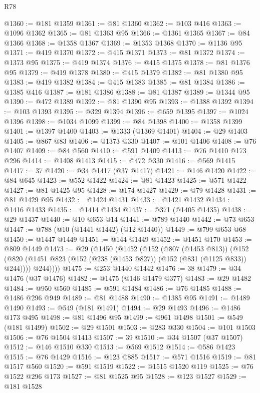\begin{lexlean}{R78}
\begin{coremodule}
@1360 := @181 @1359
@1361 := @81 @1360
@1362 := @103 @416
@1363 := @1096 @1362
@1365 := @81 @1363 @95
@1366 := @1361 @1365
@1367 := @84 @1366
@1368 := @1358 @1367
@1369 := @1353 @1368
@1370 := @1136 @95
@1371 := @419 @1370
@1372 := @415 @1371
@1373 := @81 @1372
@1374 := @1373 @95
@1375 := @419 @1374
@1376 := @415 @1375
@1378 := @81 @1376 @95
@1379 := @419 @1378
@1380 := @415 @1379
@1382 := @81 @1380 @95
@1383 := @419 @1382
@1384 := @415 @1383
@1385 := @81 @1384
@1386 := @1385 @416
@1387 := @181 @1386
@1388 := @81 @1387
@1389 := @1344 @95
@1390 := @472 @1389
@1392 := @81 @1390 @95
@1393 := @1388 @1392
@1394 := @103 @1393
@1395 := @329 @1394
@1396 := @659 @1395
@1397 := @1024 @1396
@1398 := @1034 @1099
@1399 := @84 @1398
@1400 := @1358 @1399
@1401 := @1397 @1400
@1403 := @1333 (@1369 @1401)
@1404 := @29 @1403
@1405 := @867 @83
@1406 := @1373 @330
@1407 := @101 @1406
@1408 := @76 @1407
@1409 := @84 @560
@1410 := @591 @1409
@1413 := @76 @1410 @173 @296
@1414 := @1408 @1413
@1415 := @472 @330
@1416 := @569 @1415
@1417 := 37
@1420 := @34 @1417 (@37 @1417)
@1421 := @146 @1420
@1422 := @84 @645
@1423 := @552 @1422
@1424 := @81 @1423
@1425 := @571 @1422
@1427 := @81 @1425 @95
@1428 := @174 @1427
@1429 := @79 @1428
@1431 := @81 @1429 @95
@1432 := @1424 @1431
@1433 := @1421 @1432
@1434 := @1416 @1433
@1435 := @1414 @1434
@1437 := @371 (@1405 @1435)
@1438 := @29 @1437
@1440 := @10 @653 @14
@1441 := @789 @1440
@1442 := @73 @653
@1447 := @788 (@10 (@1441 @1442) (@12 @1440))
@1449 := @799 @653 @68
@1450 := @1447 @1449
@1451 := @144 @1449
@1452 := @1451 @170
@1453 := @809 @1449
@1473 := @29
    (@1450
      (@1452
        (@152
          (@807 (@1453 @813))
          (@152
            (@820 (@1451 @823 (@152 (@238 (@1453 @827)) (@152 (@831 (@1125 @833)) @244))))
            @244))))
@1475 := @253 @1440 @1442
@1476 := 38
@1479 := @34 @1476 (@37 @1476)
@1482 := @1475 (@146 @1479 @377)
@1483 := @29 @1482
@1484 := @950 @560
@1485 := @591 @1484
@1486 := @76 @1485
@1488 := @1486 @296 @949
@1489 := @81 @1488
@1490 := @1385 @95
@1491 := @1489 @1490
@1493 := @549 (@181 @1491)
@1494 := @29 @1493
@1496 := @1486 @173 @495
@1498 := @81 @1496 @95
@1499 := @961 @1498
@1501 := @549 (@181 @1499)
@1502 := @29 @1501
@1503 := @283 @330
@1504 := @101 @1503
@1506 := @76 @1504 @1413
@1507 := 39
@1510 := @34 @1507 (@37 @1507)
@1512 := @146 @1510 @330
@1513 := @569 @1512
@1514 := @586 @1423
@1515 := @76 @1429
@1516 := @123 @885
@1517 := @571 @1516
@1519 := @81 @1517 @560
@1520 := @591 @1519
@1522 := @1515 @1520 @119
@1525 := @76 @1522 @296 @173
@1527 := @81 @1525 @95
@1528 := @123 @1527
@1529 := @181 @1528

\end{coremodule}
\end{lexlean}
